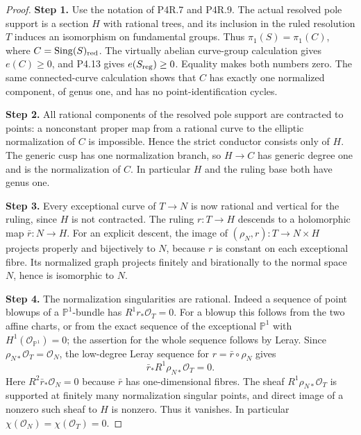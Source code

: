 \begin{proof}
\noindent\textbf{Step 1.} Use the notation of P4R.7 and P4R.9.
The actual resolved pole support is
a section $H$ with rational trees,
and its inclusion in the ruled
resolution $T$ induces an isomorphism
on fundamental groups. Thus
$\pi_1(S)=\pi_1(C)$, where
$C=\operatorname{Sing}(S)_{\rm red}$.
The virtually abelian curve-group
calculation gives $e(C)\ge0$, and
P4.13 gives $e(S_{\rm reg})\ge0$.
Equality makes both numbers zero.
The same connected-curve calculation
shows that $C$ has exactly one
normalized component, of genus one,
and has no point-identification
cycles.

\noindent\textbf{Step 2.} All rational components of the
resolved pole support are contracted
to points: a nonconstant proper map
from a rational curve to the
elliptic normalization of $C$ is
impossible. Hence the strict
conductor consists only of $H$.
The generic cusp has one
normalization branch, so
$H\to C$ has generic degree one
and is the normalization of $C$.
In particular $H$ and the ruling
base both have genus one.

\noindent\textbf{Step 3.} Every exceptional curve of
$T\to N$ is now rational and
vertical for the ruling, since
$H$ is not contracted. The ruling
$r:T\to H$ descends to a holomorphic
map $\bar r:N\to H$. For an explicit
descent, the image of
$(\rho_N,r):T\to N\times H$
projects properly and bijectively
to $N$, because $r$ is constant
on each exceptional fibre. Its
normalized graph projects finitely
and birationally to the normal
space $N$, hence is isomorphic
to $N$.

\noindent\textbf{Step 4.} The normalization singularities
are rational. Indeed a sequence
of point blowups of a
$\mathbb P^1$-bundle has
$R^1r_*\mathcal O_T=0$.
For a blowup this follows from
the two affine charts, or from
the exact sequence of the
exceptional $\mathbb P^1$ with
$H^1(\mathcal O_{\mathbb P^1})=0$;
the assertion for the whole
sequence follows by Leray.
Since $\rho_{N*}\mathcal O_T
=\mathcal O_N$, the low-degree
Leray sequence for
$r=\bar r\circ\rho_N$ gives
\[
 \bar r_*R^1\rho_{N*}\mathcal O_T=0.
\]
Here $R^2\bar r_*\mathcal O_N=0$
because $\bar r$ has one-dimensional
fibres. The sheaf
$R^1\rho_{N*}\mathcal O_T$ is
supported at finitely many
normalization singular points,
and direct image of a nonzero
such sheaf to $H$ is nonzero.
Thus it vanishes. In particular
$\chi(\mathcal O_N)
=\chi(\mathcal O_T)=0$.


\end{proof}
